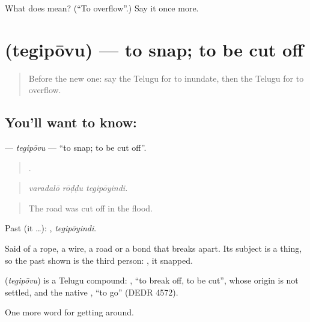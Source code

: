 \begin{tcolorbox}[breakable,colback=teal!4,colframe=teal!35!black,title={Before you move on}]
What does  mean? (\textquotedblleft{}To overflow\textquotedblright{}.) Say it once more.
\end{tcolorbox}
\section[\texorpdfstring{\te{తెగిపోవు} (tegipōvu)}{తెగిపోవు (tegipōvu)}]{ (tegipōvu) — to snap; to be cut off}

\label{lesson:TE-C480-tegipovu}



\begin{quote}
Before the new one: say the Telugu for to inundate, then the Telugu for to overflow.
\end{quote}

\subsection*{You'll want to know: }
\textbf{} — \emph{tegipōvu} — \textquotedblleft{}to snap; to be cut off\textquotedblright{}.

\begin{quote}
  .
\end{quote}

\begin{quote}
\emph{varadalō rōḍḍu tegipōyindi.}
\end{quote}

\begin{quote}
The road was cut off in the flood.
\end{quote}

Past (it …): , \emph{tegipōyindi}.

Said of a rope, a wire, a road or a bond that breaks apart. Its subject is a thing, so the past shown is the third person: , it snapped.

\begin{cousinweb}
\textbf{} (\emph{tegipōvu}) is a Telugu compound: , \textquotedblleft{}to break off, to be cut\textquotedblright{}, whose origin is not settled, and the native , \textquotedblleft{}to go\textquotedblright{} (DEDR 4572).
\end{cousinweb}

\begin{grammarlens}[title={What you've built}]
One more word for getting around.
\end{grammarlens}

